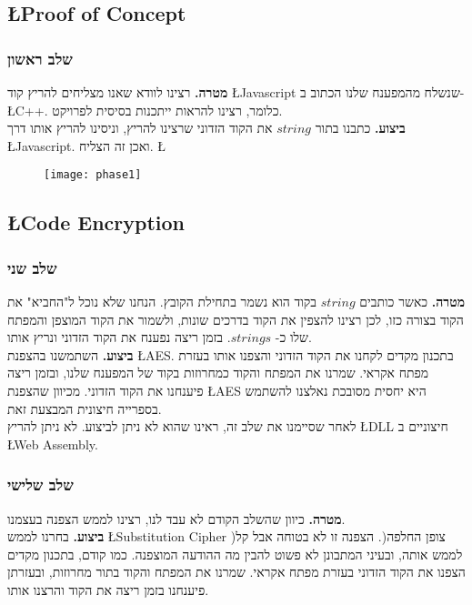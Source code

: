 \documentclass{article}
\newcommand{\goal}{\textbf{מטרה. }}
\newcommand{\action}{\textbf{ביצוע. }}
\begin{document}
			\subsection*{\L{Proof of Concept}}
			\subsubsection{שלב ראשון}
				\goal 
				רצינו לוודא שאנו מצליחים להריץ קוד 
				\L{Javascript} 
				שנשלח מהמפענח שלנו הכתוב ב- 
				\L{C++}. 
				כלומר, רצינו להראות ייתכנות בסיסית לפרויקט. \\				
				\action 
				כתבנו בתור $string$ את הקוד הזדוני שרצינו להריץ, וניסינו להריץ אותו דרך 
				\L{Javascript}. 
				ואכן זה הצליח. 
		\L{\begin{figure}[h]
				\centering
				\texttt{[image: phase1]}
		\end{figure}}
			\subsection*{\L{Code Encryption}}
			\subsubsection{שלב שני}
				\goal 
				כאשר כותבים $string$ בקוד הוא נשמר בתחילת הקובץ. 
				הנחנו שלא נוכל ל"החביא" את הקוד בצורה כזו,  
				לכן רצינו להצפין את הקוד בדרכים שונות, ולשמור את הקוד המוצפן והמפתח שלו כ- $strings$. 
				בזמן ריצה נפענח את הקוד הזדוני ונריץ אותו. 	\\
				\action
				השתמשנו בהצפנת 
				\L{AES}. 
				בתכנון מקדים לקחנו את הקוד הזדוני והצפנו אותו בעזרת מפתח אקראי. 
				שמרנו את המפתח והקוד כמחרוזות בקוד של המפענח שלנו, ובזמן ריצה פיענחנו את הקוד הזדוני. 
				מכיוון שהצפנת 
				\L{AES} 
				היא יחסית מסובכת נאלצנו להשתמש בספרייה חיצונית 
				המבצעת זאת. \\ 
				לאחר שסיימנו את שלב זה, ראינו שהוא לא ניתן לביצוע. 
				לא ניתן להריץ 
				\L{DLL} 
				חיצוניים ב 
				\L{Web Assembly}. 
			\subsubsection{שלב שלישי}
				\goal
				כיוון שהשלב הקודם לא עבד לנו, רצינו לממש הצפנה בעצמנו. \\
				\action
				בחרנו לממש  
				\L{Substitution Cipher} 
				)צופן החלפה(. הצפנה זו לא בטוחה אבל קל לממש אותה, ובעיני המתבונן לא פשוט להבין מה ההודעה המוצפנה. 
				כמו קודם, בתכנון מקדים הצפנו את הקוד הזדוני בעזרת מפתח אקראי. 
				שמרנו את המפתח והקוד בתור מחרוזות, ובעזרתן פיענחנו בזמן ריצה את הקוד והרצנו אותו. 
\end{document}
